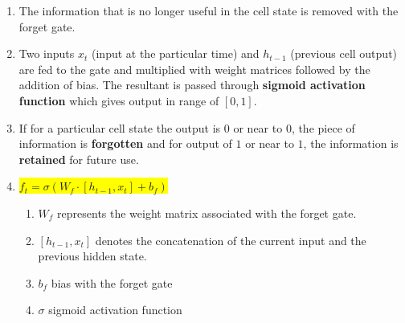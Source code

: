 \begin{enumerate}
    \item The information that is no longer useful in the cell state is removed with the forget gate.
    \hfill \cite{geeksforgeeks/deep-learning/deep-learning-introduction-to-long-short-term-memory}

    \item Two inputs $x_t$ (input at the particular time) and $h_{t-1}$ (previous cell output) are fed to the gate and multiplied with weight matrices followed by the addition of bias. 
    The resultant is passed through \textbf{sigmoid activation function} which gives output in range of $[0,1]$. 
    \hfill \cite{geeksforgeeks/deep-learning/deep-learning-introduction-to-long-short-term-memory}
    
    \item If for a particular cell state the output is $0$ or near to $0$, the piece of information is \textbf{forgotten} and for output of $1$ or near to $1$, the information is \textbf{retained} for future use. 
    \hfill \cite{geeksforgeeks/deep-learning/deep-learning-introduction-to-long-short-term-memory}

    \item \colorbox{yellow}{$ f_t=\sigma(W_f\cdot[h_{t-1},x_t]+b_f) $}
    \hfill \cite{geeksforgeeks/deep-learning/deep-learning-introduction-to-long-short-term-memory}
    \begin{enumerate}
        \item $W_f$ represents the weight matrix associated with the forget gate.
        \hfill \cite{geeksforgeeks/deep-learning/deep-learning-introduction-to-long-short-term-memory}

        \item $[h_{t-1},x_t]$ denotes the concatenation of the current input and the previous hidden state.
        \hfill \cite{geeksforgeeks/deep-learning/deep-learning-introduction-to-long-short-term-memory}

        \item $b_f$ bias with the forget gate
        \hfill \cite{geeksforgeeks/deep-learning/deep-learning-introduction-to-long-short-term-memory}

        \item $\sigma$ sigmoid activation function
        \hfill \cite{geeksforgeeks/deep-learning/deep-learning-introduction-to-long-short-term-memory}
    \end{enumerate}
\end{enumerate}


